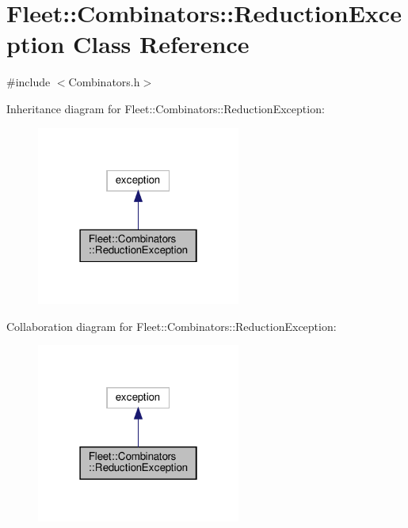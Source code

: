 \hypertarget{class_fleet_1_1_combinators_1_1_reduction_exception}{}\section{Fleet\+:\+:Combinators\+:\+:Reduction\+Exception Class Reference}
\label{class_fleet_1_1_combinators_1_1_reduction_exception}


{\ttfamily \#include $<$Combinators.\+h$>$}



Inheritance diagram for Fleet\+:\+:Combinators\+:\+:Reduction\+Exception\+:\nopagebreak
\begin{figure}[H]
\begin{center}
\leavevmode
\includegraphics[width=190pt]{class_fleet_1_1_combinators_1_1_reduction_exception__inherit__graph}
\end{center}
\end{figure}


Collaboration diagram for Fleet\+:\+:Combinators\+:\+:Reduction\+Exception\+:\nopagebreak
\begin{figure}[H]
\begin{center}
\leavevmode
\includegraphics[width=190pt]{class_fleet_1_1_combinators_1_1_reduction_exception__coll__graph}
\end{center}
\end{figure}


